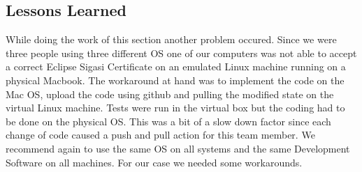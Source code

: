 \subsection{Lessons Learned}
While doing the work of this section another problem occured. Since we were three people using three different OS one of our computers was not able to accept a correct Eclipse Sigasi Certificate on an emulated Linux machine running on a physical Macbook. The workaround at hand was to implement the code on the Mac OS, upload the code using github and pulling the modified  state on the virtual Linux machine. Tests were run in the virtual box but the coding had to be done on the physical OS. This was a bit of a slow down factor since each change of code caused a push and pull action for this team member. We recommend again to use the same OS on all systems and the same Development Software on all machines. For our case we needed some workarounds.
